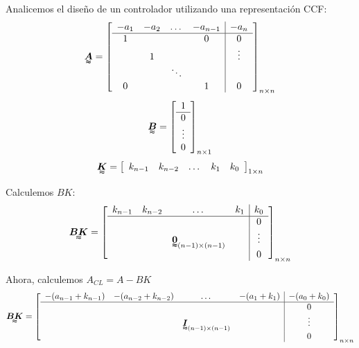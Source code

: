 \par Analicemos el diseño de un controlador utilizando una representación CCF:
\begin{align*}
\tenq{A}=\left[
    \begin{array}{cccc|c}
     -a_1 & -a_2 & \dots & -a_{n-1} & -a_n\\ \hline
     1 & & & 0 & 0\\
       & 1 & & & \vdots\\
       & & \ddots & & \\
     0 & & & 1 & 0  
    \end{array}\right]_{n\times n}
\end{align*}
\begin{align*}
\tenq{B}=\left[
    \begin{array}{c}
     1 \\ \hline
     0\\
    \vdots\\
     0  
    \end{array}\right]_{n\times 1}
\end{align*}
\begin{align*}
\tenq{K}=\left[
    \begin{array}{ccccc}
     k_{n-1} & k_{n-2} & \dots & k_1 & k_0
    \end{array}\right]_{1\times n}
\end{align*}

Calculemos $BK$:
\begin{align*}
\tenq{BK}=\left[
    \begin{array}{cccc|c}
     k_{n-1} & k_{n-2} & \dots & k_1 & k_0\\ \hline
      & & & & 0\\
      & & \tenq{0}_{(n-1)\times(n-1)} & & \vdots\\
      & & & & 0  
    \end{array}\right]_{n\times n}
\end{align*}

Ahora, calculemos $A_{CL}=A-BK$
\begin{align*}
\tenq{BK}=\left[
    \begin{array}{cccc|c}
     -(a_{n-1}+k_{n-1}) & -(a_{n-2}+k_{n-2}) & \dots & -(a_1+k_1) & -(a_0+k_0)\\ \hline
      & & & & 0\\
      & & \tenq{I}_{(n-1)\times(n-1)} & & \vdots\\
      & & & & 0  
    \end{array}\right]_{n\times n}
\end{align*}


